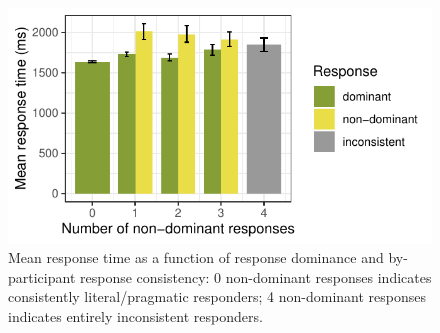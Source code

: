 \documentclass[10pt,letterpaper]{article}
\newcommand{\jd}[1]{\textcolor{Red}{[jd: #1]}}
\newcommand{\lk}[1]{\textcolor{Blue}{[lk: #1]}}
\begin{document}
\begin{figure}
  \centering
    \includegraphics[width=\columnwidth]{plots/consistency}
    \caption{Mean response time as a function of response dominance and by-participant response consistency: 0 non-dominant responses indicates consistently literal/pragmatic responders; 4 non-dominant responses indicates entirely inconsistent responders.}
    \label{fig:consistency}
  \end{figure}



\end{document}
